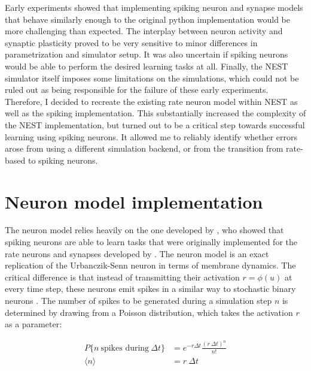 Early experiments showed that implementing spiking neuron and synapse models that behave similarly enough to the
original python implementation would be more challenging than expected. The interplay between neuron activity and
synaptic plasticity proved to be very sensitive to minor differences in parametrization and simulator setup. It was also
uncertain if spiking neurons would be able to perform the desired learning tasks at all. Finally, the NEST simulator
itself imposes some limitations on the simulations, which could not be ruled out as being responsible for the failure of
these early experiments. Therefore, I decided to recreate the existing rate neuron model within NEST as well as the
spiking implementation. This substantially increased the complexity of the NEST implementation, but turned out to be a
critical step towards successful learning using spiking neurons. It allowed me to reliably identify whether errors arose
from using a different simulation backend, or from the transition from rate-based to spiking neurons.


\section{Neuron model implementation}

The neuron model relies heavily on the one developed by \cite{Stapmanns2021}, who showed that spiking neurons are able
to learn tasks that were originally implemented for the rate neurons and synapses developed by
\cite{urbanczik2014learning}. The neuron model is an exact replication of the Urbanczik-Senn neuron in terms of membrane
dynamics. The critical difference is that instead of transmitting their activation $r = \phi(u)$ at every time step,
these neurons emit spikes in a similar way to stochastic binary neurons \citep{Ginzburg1994}. The number of spikes to be
generated during a simulation step $n$ is determined by drawing from a Poisson distribution, which takes the activation
$r$ as a parameter:

\begin{align}
  P\{\textit{n} \ \text{spikes during} \ \Delta t\} & = e^{-r \Delta t} \frac{(r \ \Delta t) ^ n}{n!}\label{eq-pr-n-spikes} \\
  \langle \textit{n} \rangle                        & = r \ \Delta t
\end{align}


